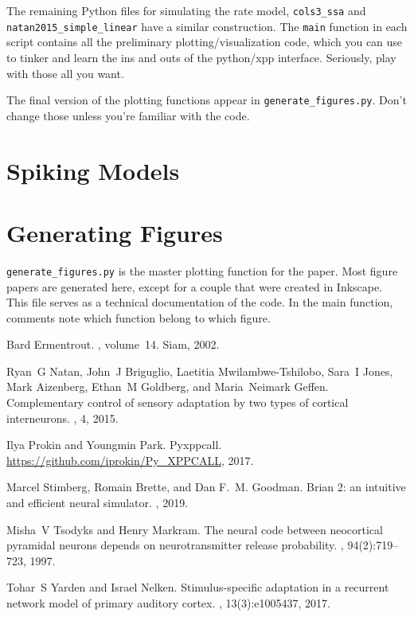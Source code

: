 \documentclass[a4paper,10pt]{article}
\newcommand{\y}[1]{{\texttt{#1}}}
\begin{document}
The remaining Python files for simulating the rate model, \y{cols3\_ssa} and \y{natan2015\_simple\_linear} have a similar construction. The \y{main} function in each script contains all the preliminary plotting/visualization code, which you can use to tinker and learn the ins and outs of the python/xpp interface. Seriously, play with those all you want.

The final version of the plotting functions appear in \y{generate\_figures.py}. Don't change those unless you're familiar with the code.


\section{Spiking Models}

\section{Generating Figures}

\y{generate\_figures.py} is the master plotting function for the paper. Most figure papers are generated here, except for a couple that were created in Inkscape. This file serves as a technical documentation of the code. In the main function, comments note which function belong to which figure.

\begin{thebibliography}{1}

Bard Ermentrout.
, volume~14.
\newblock Siam, 2002.

Ryan~G Natan, John~J Briguglio, Laetitia Mwilambwe-Tshilobo, Sara~I Jones, Mark
  Aizenberg, Ethan~M Goldberg, and Maria~Neimark Geffen.
\newblock Complementary control of sensory adaptation by two types of cortical
  interneurons.
, 4, 2015.

Ilya Prokin and Youngmin Park.
\newblock Pyxppcall.
\newblock \url{https://github.com/iprokin/Py_XPPCALL}, 2017.

Marcel Stimberg, Romain Brette, and Dan F.~M. Goodman.
\newblock Brian 2: an intuitive and efficient neural simulator.
, 2019.

Misha~V Tsodyks and Henry Markram.
\newblock The neural code between neocortical pyramidal neurons depends on
  neurotransmitter release probability.
,
  94(2):719--723, 1997.

Tohar~S Yarden and Israel Nelken.
\newblock Stimulus-specific adaptation in a recurrent network model of primary
  auditory cortex.
, 13(3):e1005437, 2017.

\end{thebibliography}
\end{document}
